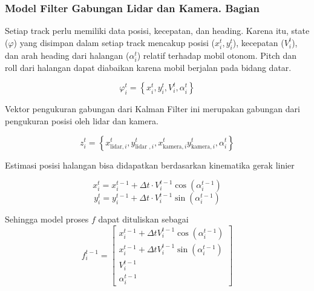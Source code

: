 \begin{frame}[allowframebreaks]
    \frametitle{Model Filter Gabungan Lidar dan Kamera. Bagian}

    Setiap track perlu memiliki data posisi, kecepatan, dan heading. Karena itu, state ($\varphi$) yang disimpan dalam setiap track mencakup posisi ($x_{i}^{t}, y_{i}^{t}$), kecepatan ($V_{i}^{t}$), dan arah heading dari halangan ($\alpha_{i}^{t}$) relatif terhadap mobil otonom. Pitch dan roll dari halangan dapat diabaikan karena mobil berjalan pada bidang datar.

    \begin{equation}
        \varphi_{i}^{t}=\left\{x_{i}^{t}, y_{i}^{t}, V_{i}^{t}, \alpha_{i}^{t}\right\}
    \end{equation}

    Vektor pengukuran gabungan dari Kalman Filter ini merupakan gabungan dari pengukuran posisi oleh lidar dan kamera.
    
    \begin{equation}
        z_{i}^{t}=\left\{x_{\text {lidar}, i}^{t}, y_{\text {lidar }, i}^{t}, x_{\text {kamera}, i}^{t} y_{\text {kamera}, i}^{t}, \alpha_{i}^{t}\right\}
        \label{eq: 3-meas-vec}
    \end{equation}

    Estimasi posisi halangan bisa didapatkan berdasarkan kinematika gerak linier

    \begin{equation}
        x_{i}^{t} = x_{i}^{t-1} + \Delta t \cdot V_{i}^{t-1} \cos \left(\alpha_{i}^{t-1}\right)
    \end{equation}
    \begin{equation}
        y_{i}^{t} = y_{i}^{t-1} + \Delta t \cdot V_{i}^{t-1} \sin \left(\alpha_{i}^{t-1}\right)
    \end{equation}

    Sehingga model proses $f$ dapat dituliskan sebagai
    \begin{equation}
        f_{i}^{t-1}=\left[\begin{array}{c}
        x_{i}^{t-1}+\Delta t V_{i}^{t-1} \cos \left(\alpha_{i}^{t-1}\right) \\
        x_{i}^{t-1}+\Delta t V_{i}^{t-1} \sin \left(\alpha_{i}^{t-1}\right) \\
        V_{i}^{t-1} \\
        \alpha_{i}^{t-1}
        \end{array}\right]
        \label{eq:model-process}
    \end{equation}


\end{frame}
